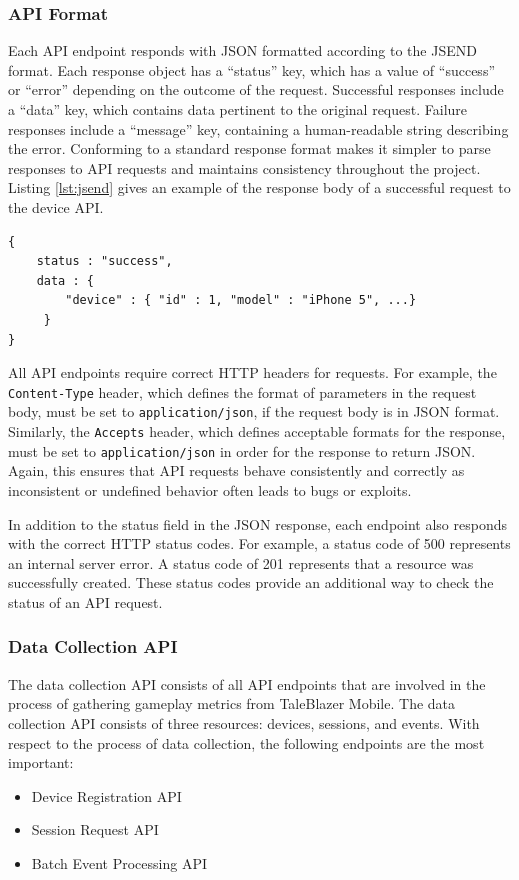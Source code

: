 \subsubsection{API Format}

Each API endpoint responds with JSON formatted according to the JSEND format. \cite{site:jsend} Each response object has a ``status'' key, which has a value of ``success'' or ``error'' depending on the outcome of the request. Successful responses include a ``data'' key, which contains data pertinent to the original request. Failure responses include a ``message'' key, containing a human-readable string describing the error. Conforming to a standard response format makes it simpler to parse responses to API requests and maintains consistency throughout the project. Listing \ref{lst:jsend} gives an example of the response body of a successful request to the device API.

\pagebreak
\begin{lstlisting}[caption={[API Response Format Example]Example API format, using JSEND}, label={lst:jsend}]
{
    status : "success",
    data : {
        "device" : { "id" : 1, "model" : "iPhone 5", ...}
     }
}
\end{lstlisting}

All API endpoints require correct HTTP headers for requests. For example, the \texttt{Content-Type} header, which defines the format of parameters in the request body, must be set to \texttt{application/json}, if the request body is in JSON format. Similarly, the \texttt{Accepts} header, which defines acceptable formats for the response, must be set to \texttt{application/json} in order for the response to return JSON. Again, this ensures that API requests behave consistently and correctly as inconsistent or undefined behavior often leads to bugs or exploits.

In addition to the status field in the JSON response, each endpoint also responds with the correct HTTP status codes. For example, a status code of 500 represents an internal server error. A status code of 201 represents that a resource was successfully created. These status codes provide an additional way to check the status of an API request.

\subsubsection{Data Collection API}
\label{subsec:collection_api}

The data collection API consists of all API endpoints that are involved in the process of gathering gameplay metrics from TaleBlazer Mobile. The data collection API consists of three resources: devices, sessions, and events. With respect to the process of data collection, the following endpoints are the most important:
	\begin{itemize}
		\item Device Registration API
		\item Session Request API
		\item Batch Event Processing API
	\end{itemize}

